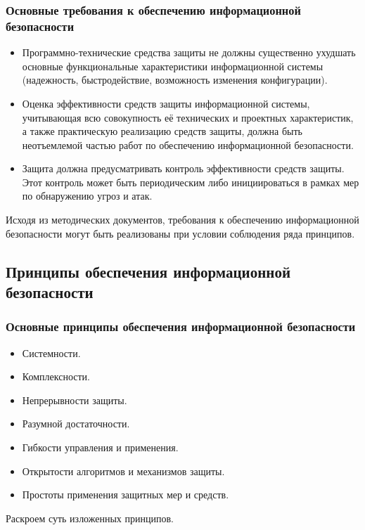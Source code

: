 \begin{frame}
\frametitle{Основные требования к обеспечению информационной безопасности}
\begin{itemize}
\item Программно-технические средства защиты не должны существенно ухудшать основные функциональные характеристики информационной системы (надежность, быстродействие, возможность изменения конфигурации).
\item Оценка эффективности средств защиты информационной системы, учитывающая всю совокупность её технических и проектных характеристик, а также практическую реализацию средств защиты, должна быть неотъемлемой частью работ по обеспечению информационной безопасности.
\item Защита должна предусматривать контроль эффективности средств защиты. Этот контроль может быть периодическим либо инициироваться в рамках мер по обнаружению угроз и атак.
\end{itemize}
\end{frame}


Исходя из методических документов, требования к обеспечению информационной безопасности могут быть реализованы при условии соблюдения ряда принципов.


\subsection[Принципы обеспечения ИБ]{Принципы обеспечения информационной безопасности}

\begin{frame}
\frametitle{Основные принципы обеспечения информационной безопасности}
\begin{itemize}
\item Системности.
\item Комплексности.
\item Непрерывности защиты.
\item Разумной достаточности.
\item Гибкости управления и применения.
\item Открытости алгоритмов и механизмов защиты.
\item Простоты применения защитных мер и средств.
\end{itemize}
\end{frame}

Раскроем суть изложенных принципов.

